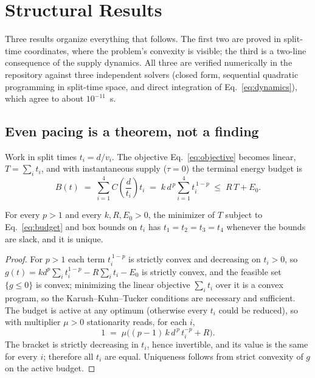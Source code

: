 \section{Structural Results}\label{sec:theorems}

Three results organize everything that follows. The first two are proved in
split-time coordinates, where the problem's convexity is visible; the third
is a two-line consequence of the supply dynamics. All three are verified
numerically in the repository against three independent solvers (closed form,
sequential quadratic programming in split-time space, and direct integration
of Eq.~\eqref{eq:dynamics}), which agree to about $10^{-11}$~s.

\subsection{Even pacing is a theorem, not a finding}

Work in split times $t_i = d/v_i$. The objective
Eq.~\eqref{eq:objective} becomes linear, $T = \sum_i t_i$, and with
instantaneous supply ($\tau=0$) the terminal energy budget is
\begin{equation}
  B(t) \;=\; \sum_{i=1}^{4} C\!\left(\frac{d}{t_i}\right) t_i
       \;=\; k\, d^{\,p} \sum_{i=1}^{4} t_i^{\,1-p}
       \;\le\; R\,T + E_0 .
  \label{eq:budget}
\end{equation}

\begin{theorem}\label{thm:even}
For every $p > 1$ and every $k, R, E_0 > 0$, the minimizer of $T$ subject to
Eq.~\eqref{eq:budget} and box bounds on $t_i$ has $t_1 = t_2 = t_3 = t_4$
whenever the bounds are slack, and it is unique.
\end{theorem}

\begin{proof}
For $p>1$ each term $t_i^{\,1-p}$ is strictly convex and decreasing on
$t_i>0$, so $g(t) = k d^p \sum_i t_i^{1-p} - R\sum_i t_i - E_0$ is strictly
convex, and the feasible set $\{g \le 0\}$ is convex; minimizing the linear
objective $\sum_i t_i$ over it is a convex program, so the
Karush--Kuhn--Tucker conditions are necessary and sufficient. The budget is
active at any optimum (otherwise every $t_i$ could be reduced), so with
multiplier $\mu > 0$ stationarity reads, for each $i$,
\[
  1 \;=\; \mu\Big( (p-1)\,k\,d^{\,p}\, t_i^{-p} + R \Big).
\]
The bracket is strictly decreasing in $t_i$, hence invertible, and its value
is the same for every $i$; therefore all $t_i$ are equal. Uniqueness follows
from strict convexity of $g$ on the active budget.
\end{proof}

